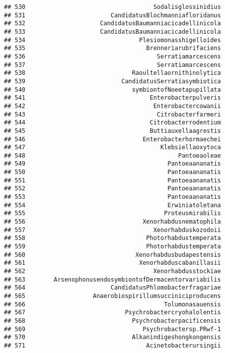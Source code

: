 \documentclass[
]{article}
\begin{document}
\begin{verbatim}
## 530                                    Sodalisglossinidius
## 531                        CandidatusBlochmanniafloridanus
## 532                     CandidatusBaumanniacicadellinicola
## 533                     CandidatusBaumanniacicadellinicola
## 534                                Plesiomonasshigelloides
## 535                                  Brenneriarubrifaciens
## 536                                     Serratiamarcescens
## 537                                     Serratiamarcescens
## 538                              Raoultellaornithinolytica
## 539                           CandidatusSerratiasymbiotica
## 540                              symbiontofNoeetapupillata
## 541                                   Enterobacterpulveris
## 542                                    Enterobactercowanii
## 543                                     Citrobacterfarmeri
## 544                                   Citrobacterrodentium
## 545                                   Buttiauxellaagrestis
## 546                                 Enterobacterhormaechei
## 547                                      Klebsiellaoxytoca
## 548                                           Pantoeaoleae
## 549                                        Pantoeaananatis
## 550                                        Pantoeaananatis
## 551                                        Pantoeaananatis
## 552                                        Pantoeaananatis
## 553                                        Pantoeaananatis
## 554                                        Erwiniatoletana
## 555                                       Proteusmirabilis
## 556                                 Xenorhabdusnematophila
## 557                                    Xenorhabduskozodoii
## 558                                  Photorhabdustemperata
## 559                                  Photorhabdustemperata
## 560                               Xenorhabdusbudapestensis
## 561                                Xenorhabduscabanillasii
## 562                                    Xenorhabdusstockiae
## 563        ArsenophonusendosymbiontofDermacentorvariabilis
## 564                        CandidatusPhlomobacterfragariae
## 565                   Anaerobiospirillumsucciniciproducens
## 566                                       Tolumonasauensis
## 567                            Psychrobactercryohalolentis
## 568                              Psychrobacterpacificensis
## 569                                 Psychrobactersp.PRwf-1
## 570                              Alkanindigeshongkongensis
## 571                                  Acinetobacterursingii

\end{verbatim}
\end{document}
